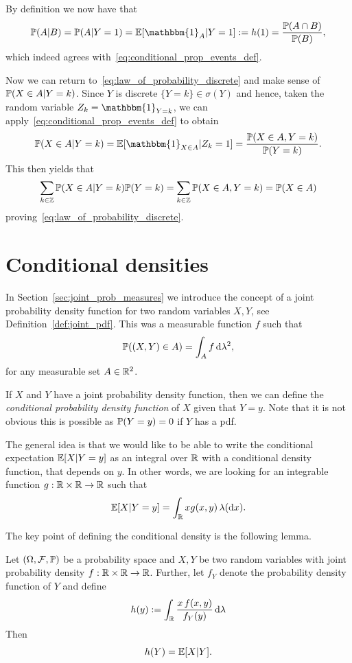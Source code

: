 By definition we now have that 
\[
	\bbP(A | B) = \bbP(A | Y = 1) = \bbE[\mathbbm{1}_A | Y = 1] := h(1) = \frac{\bbP(A \cap B)}{\bbP(B)},
\]
which indeed agrees with~\eqref{eq:conditional_prop_events_def}.


Now we can return to~\eqref{eq:law_of_probability_discrete} and make sense of $\mathbb P(X \in A | Y = k)$. Since $Y$ is discrete $\{Y = k\} \in \sigma(Y)$ and hence, taken the random variable $Z_k = \mathbbm{1}_{Y = k}$, we can apply~\ref{eq:conditional_prop_events_def} to obtain 
\[
	\bbP(X \in A | Y = k) = \bbE[\mathbbm{1}_{X \in A} | Z_k = 1]
	= \frac{\bbP(X \in A, Y = k)}{\bbP(Y = k)}.
\]
This then yields that
\[
	\sum_{k \in \mathbb{Z}} \mathbb P(X \in A | Y = k) \mathbb P(Y = k) 
	= \sum_{k \in \mathbb{Z}} \mathbb P(X \in A, Y = k) = \mathbb P(X \in A)
\]
proving~\eqref{eq:law_of_probability_discrete}.

\section{Conditional densities}

In Section~\ref{sec:joint_prob_measures} we introduce the concept of a joint probability density function for two random variables $X, Y$, see Definition~\ref{def:joint_pdf}. This was a measurable function $f$ such that
\[
	\mathbb P((X,Y) \in A) = \int_A f \, \mathrm{d} \lambda^2,
\]
for any measurable set $A \in \mathbb R^2$.

If $X$ and $Y$ have a joint probability density function, then we can define the \emph{conditional probability density function} of $X$ given that $Y = y$. Note that it is not obvious this is possible as $\mathbb P(Y = y) = 0$ if $Y$ has a pdf. 

The general idea is that we would like to be able to write the conditional expectation $\mathbb E[X | Y = y]$ as an integral over $\mathbb R$ with a conditional density function, that depends on $y$. In other words, we are looking for an integrable function $g : \mathbb R \times \mathbb R \to \mathbb R$ such that
\[
	\mathbb E[X | Y = y] = \int_{\mathbb R} x g(x,y) \, \lambda (\mathrm{d} x).
\]


The key point of defining the conditional density is the following lemma.


\begin{lemma}\label{lem:condition_expectation_Y_y}
Let $(\Omega, \mathcal F, \mathbb P)$ be a probability space and $X,Y$ be two random variables with joint probability density $f : \mathbb R \times \mathbb R \to \mathbb R$. Further, let $f_Y$ denote the probability density function of $Y$ and define
\[
	h(y) := \int_{\mathbb R} \frac{x \, f(x,y)}{f_Y(y)} \, \mathrm{d} \lambda
\]
Then
\[
	h(Y) = \mathbb E[X | Y].
\]
\end{lemma}

